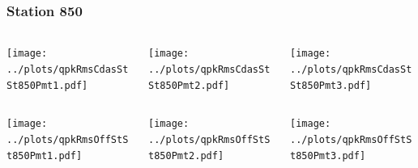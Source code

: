\documentclass[aspectratio=169]{beamer}
\begin{document}
\begin{frame} 
  \frametitle{Station 850}
  \begin{center}
    \begin{columns}
      \begin{column}{0.33\textwidth}
        \texttt{[image: ../plots/qpkRmsCdasStSt850Pmt1.pdf]}
      \end{column}
      \begin{column}{0.33\textwidth}
        \texttt{[image: ../plots/qpkRmsCdasStSt850Pmt2.pdf]}
      \end{column}
      \begin{column}{0.33\textwidth}
        \texttt{[image: ../plots/qpkRmsCdasStSt850Pmt3.pdf]}
      \end{column}
    \end{columns}
  \end{center}

  \begin{center}
    \begin{columns}
      \begin{column}{0.33\textwidth}
        \texttt{[image: ../plots/qpkRmsOffStSt850Pmt1.pdf]}
      \end{column}
      \begin{column}{0.33\textwidth}
        \texttt{[image: ../plots/qpkRmsOffStSt850Pmt2.pdf]}
      \end{column}
      \begin{column}{0.33\textwidth}
        \texttt{[image: ../plots/qpkRmsOffStSt850Pmt3.pdf]}
      \end{column}
    \end{columns}
  \end{center}
\end{frame}
\end{document}
